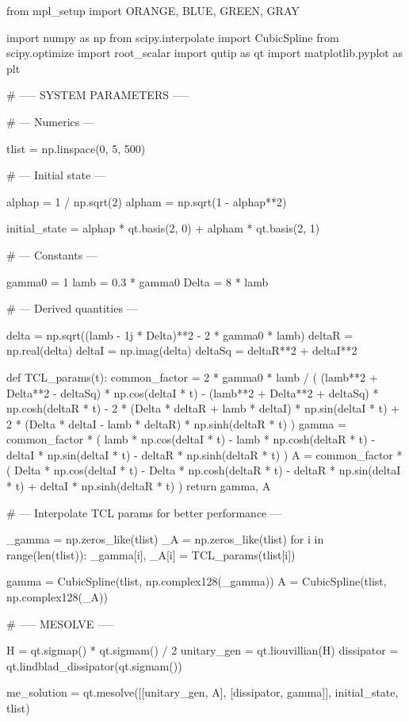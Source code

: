 from mpl_setup import ORANGE, BLUE, GREEN, GRAY

import numpy as np
from scipy.interpolate import CubicSpline
from scipy.optimize import root_scalar
import qutip as qt
import matplotlib.pyplot as plt



# ----- SYSTEM PARAMETERS -----

# --- Numerics ---

tlist = np.linspace(0, 5, 500)

# --- Initial state ---

alphap = 1 / np.sqrt(2)
alpham = np.sqrt(1 - alphap**2)

initial_state = alphap * qt.basis(2, 0) + alpham * qt.basis(2, 1)

# --- Constants ---

gamma0 = 1
lamb = 0.3 * gamma0
Delta = 8 * lamb

# --- Derived quantities ---

delta = np.sqrt((lamb - 1j * Delta)**2 - 2 * gamma0 * lamb)
deltaR = np.real(delta)
deltaI = np.imag(delta)
deltaSq = deltaR**2 + deltaI**2

def TCL_params(t):
    common_factor = 2 * gamma0 * lamb / (
        (lamb**2 + Delta**2 - deltaSq) * np.cos(deltaI * t)
        - (lamb**2 + Delta**2 + deltaSq) * np.cosh(deltaR * t)
        - 2 * (Delta * deltaR + lamb * deltaI) * np.sin(deltaI * t)
        + 2 * (Delta * deltaI - lamb * deltaR) * np.sinh(deltaR * t)
    )
    gamma = common_factor * (
        lamb * np.cos(deltaI * t) - lamb * np.cosh(deltaR * t)
        - deltaI * np.sin(deltaI * t) - deltaR * np.sinh(deltaR * t)
    )
    A = common_factor * (
        Delta * np.cos(deltaI * t) - Delta * np.cosh(deltaR * t)
        - deltaR * np.sin(deltaI * t) + deltaI * np.sinh(deltaR * t)
    )
    return gamma, A

# --- Interpolate TCL params for better performance ---

_gamma = np.zeros_like(tlist)
_A = np.zeros_like(tlist)
for i in range(len(tlist)):
    _gamma[i], _A[i] = TCL_params(tlist[i])

gamma = CubicSpline(tlist, np.complex128(_gamma))
A = CubicSpline(tlist, np.complex128(_A))



# ----- MESOLVE -----

H = qt.sigmap() * qt.sigmam() / 2
unitary_gen = qt.liouvillian(H)
dissipator = qt.lindblad_dissipator(qt.sigmam())

me_solution = qt.mesolve([[unitary_gen, A], [dissipator, gamma]], initial_state, tlist)



